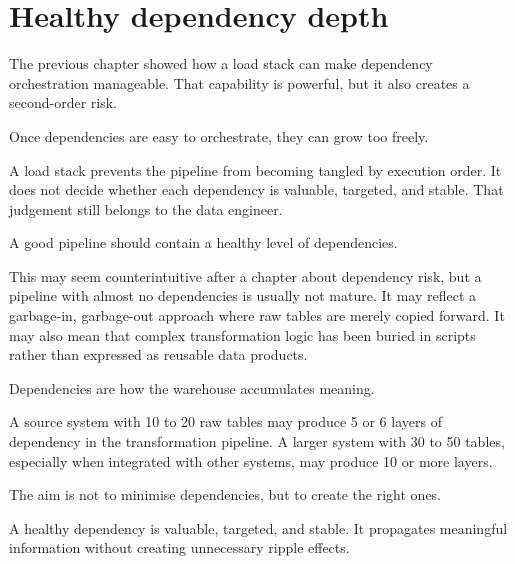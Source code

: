 \documentclass[10pt,openany,10pt]{book}
\begin{document}
\section{Healthy dependency depth}\label{healthy-dependency-depth}

The previous chapter showed how a load stack can make dependency
orchestration manageable. That capability is powerful, but it also
creates a second-order risk.

Once dependencies are easy to orchestrate, they can grow too freely.

A load stack prevents the pipeline from becoming tangled by execution
order. It does not decide whether each dependency is valuable, targeted,
and stable. That judgement still belongs to the data engineer.

A good pipeline should contain a healthy level of dependencies.

This may seem counterintuitive after a chapter about dependency risk,
but a pipeline with almost no dependencies is usually not mature. It may
reflect a garbage-in, garbage-out approach where raw tables are merely
copied forward. It may also mean that complex transformation logic has
been buried in scripts rather than expressed as reusable data products.

Dependencies are how the warehouse accumulates meaning.

A source system with 10 to 20 raw tables may produce 5 or 6 layers of
dependency in the transformation pipeline. A larger system with 30 to 50
tables, especially when integrated with other systems, may produce 10 or
more layers.

The aim is not to minimise dependencies, but to create the right ones.

A healthy dependency is valuable, targeted, and stable. It propagates
meaningful information without creating unnecessary ripple effects.
\end{document}
